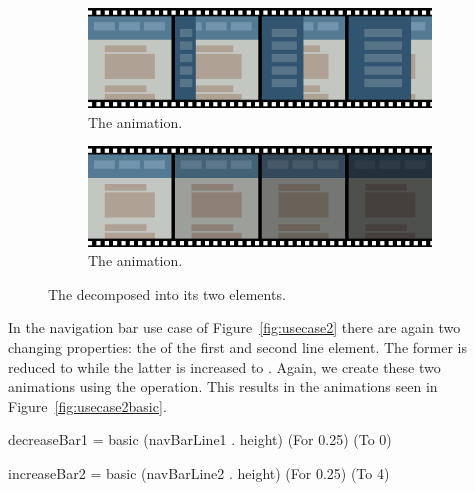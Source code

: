 \begin{figure}[h]
\centering

\begin{subfigure}[h]{\textwidth}
\centering
\includegraphics[width=\figscale\textwidth]{pictures/usecase1basic1}
\caption{The  animation.}
\label{fig:usecase1basic1}
\end{subfigure}

\begin{subfigure}[h]{\textwidth}
\centering
\includegraphics[width=\figscale\textwidth]{pictures/usecase1basic2}
\caption{The  animation.}
\label{fig:usecase1basic2}
\end{subfigure}

\caption{The  decomposed into its two elements.}
\label{fig:usecase1basic}
\end{figure}

In the navigation bar use case of Figure~\ref{fig:usecase2} there are again two changing properties: the  of the first and second line element. The former is reduced to  while the latter is increased to . Again, we create these two animations using the  operation. This results in the animations seen in Figure~\ref{fig:usecase2basic}.

\begin{spec}
decreaseBar1 = basic (navBarLine1 . height) (For 0.25) (To 0)

increaseBar2 = basic (navBarLine2 . height) (For 0.25) (To 4)
\end{spec}

